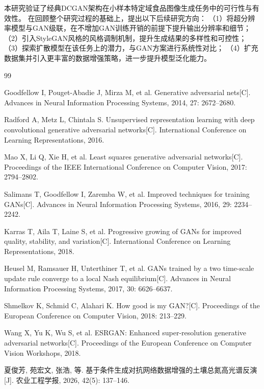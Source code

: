 \documentclass[12pt,a4paper]{ctexart}  %
\begin{document}
本研究验证了经典DCGAN架构在小样本特定域食品图像生成任务中的可行性与有效性。
在回顾整个研究过程的基础上，提出以下后续研究方向：
（1）将超分辨率模型与GAN级联，在不增加GAN训练开销的前提下提升输出分辨率和细节；
（2）引入StyleGAN风格的风格调制机制，提升生成结果的多样性和可控性；
（3）探索扩散模型在该任务上的潜力，与GAN方案进行系统性对比；
（4）扩充数据集并引入更丰富的数据增强策略，进一步提升模型泛化能力。

\begin{thebibliography}{99}
\raggedright

Goodfellow I, Pouget-Abadie J, Mirza M, et al.
Generative adversarial nets[C].
Advances in Neural Information Processing Systems, 2014, 27: 2672--2680.

Radford A, Metz L, Chintala S.
Unsupervised representation learning with deep convolutional generative adversarial networks[C].
International Conference on Learning Representations, 2016.

Mao X, Li Q, Xie H, et al.
Least squares generative adversarial networks[C].
Proceedings of the IEEE International Conference on Computer Vision, 2017: 2794--2802.

Salimans T, Goodfellow I, Zaremba W, et al.
Improved techniques for training GANs[C].
Advances in Neural Information Processing Systems, 2016, 29: 2234--2242.

Karras T, Aila T, Laine S, et al.
Progressive growing of GANs for improved quality, stability, and variation[C].
International Conference on Learning Representations, 2018.

Heusel M, Ramsauer H, Unterthiner T, et al.
GANs trained by a two time-scale update rule converge to a local Nash equilibrium[C].
Advances in Neural Information Processing Systems, 2017, 30: 6626--6637.

Shmelkov K, Schmid C, Alahari K.
How good is my GAN?[C].
Proceedings of the European Conference on Computer Vision, 2018: 213--229.

Wang X, Yu K, Wu S, et al.
ESRGAN: Enhanced super-resolution generative adversarial networks[C].
Proceedings of the European Conference on Computer Vision Workshops, 2018.

夏俊芳, 苑宏文, 张浩, 等.
基于条件生成对抗网络数据增强的土壤总氮高光谱反演[J].
农业工程学报, 2026, 42(5): 137--146.


\end{thebibliography}
\end{document}
